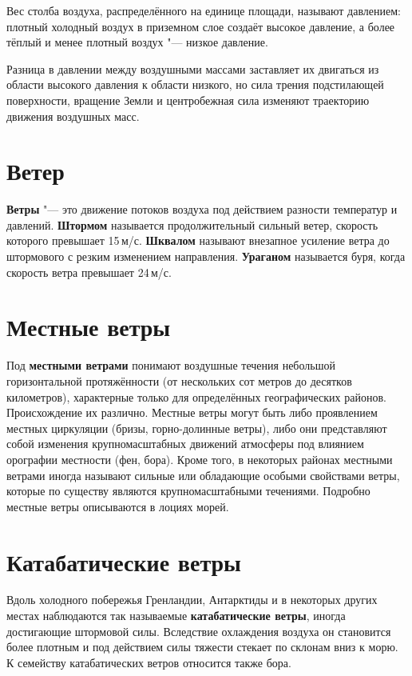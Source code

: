 \documentclass[a4paper, 12pt, twoside, draft, book, russian, fittopage, cyremdash, openright]{ncc}
\newcommand{\mps}{\,м/с\xspace}
\begin{document}
Вес столба воздуха, распределённого на единице площади, называют
давлением: плотный холодный воздух в приземном слое
создаёт высокое давление, а более тёплый и менее плотный воздух "---
низкое давление.

Разница в давлении между воздушными массами заставляет их двигаться из
области высокого давления к области низкого, но сила трения
подстилающей поверхности, вращение Земли и центробежная сила изменяют
траекторию движения воздушных масс.

\section{Ветер}
\label{sec:wind}

\textbf{Ветры} "--- это движение потоков воздуха под
действием разности температур и
давлений. \textbf{Штормом} называется продолжительный
сильный ветер, скорость которого превышает 15\mps.
\textbf{Шквалом} называют внезапное усиление ветра до
штормового с резким изменением направления.
\textbf{Ураганом} называется буря, когда скорость ветра
превышает 24\mps.

\section{Местные ветры}
\label{sec:local_winds}

Под \textbf{местными ветрами} понимают воздушные течения небольшой
горизонтальной протяжённости (от нескольких сот метров до десятков
километров), характерные только для определённых географических
районов. Происхождение их различно. Местные ветры могут быть либо
проявлением местных циркуляции (бризы, горно-долинные
ветры), либо они представляют собой
изменения крупномасштабных движений атмосферы под влиянием орографии
местности (фен, бора). Кроме того, в некоторых
районах местными ветрами иногда называют сильные или обладающие
особыми свойствами ветры, которые по существу являются
крупномасштабными течениями. Подробно местные ветры описываются в
лоциях морей.

\section{Катабатические ветры}
\label{sec:catabatic_wind}

Вдоль холодного побережья Гренландии, Антарктиды и в некоторых других
местах наблюдаются так называемые \textbf{катабатические
  ветры}, иногда достигающие штормовой
силы. Вследствие охлаждения воздуха он становится более плотным и под
действием силы тяжести стекает по склонам вниз к морю. К семейству
катабатических ветров относится также бора.
\end{document}
